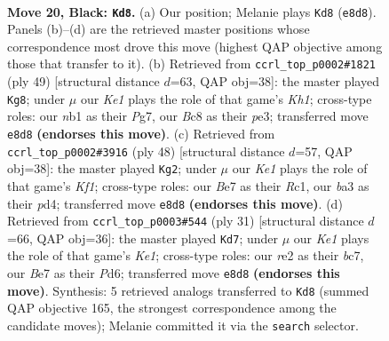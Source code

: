 \documentclass[11pt]{article}
\begin{document}
\clearpage

\begin{figure}[p]\centering
\begin{subfigure}{0.46\textwidth}\centering
\resizebox{\linewidth}{!}{%
\newchessgame
\chessboard[
  setfen={1rb1k2r/p1p1bp1p/2p3p1/2P5/PP3P1P/B7/4R3/RN2K3 b Q - 4 20},
  showmover=false,
  pgfstyle=straightmove, color=movearrow, markmove={e8-d8}
]}
\caption{}
\end{subfigure}\hfill
\begin{subfigure}{0.46\textwidth}\centering
\resizebox{\linewidth}{!}{%
\newchessgame
\chessboard[
  setfen={r4r1k/6p1/2p4p/pp1b4/6p1/P3P3/1P1R1PPK/1BR5 b - - 1 25},
  showmover=false,
  pgfstyle=straightmove, color=movearrow, markmove={h8-g8}
]}
\caption{}
\end{subfigure}
\\[4pt]
\begin{subfigure}{0.46\textwidth}\centering
\resizebox{\linewidth}{!}{%
\newchessgame
\chessboard[
  setfen={2rr4/1p3pk1/p2b2p1/8/1P1p2Pp/P2B3P/1P3P2/2RR1K2 w - - 1 25},
  showmover=false,
  pgfstyle=straightmove, color=movearrow, markmove={f1-g2}
]}
\caption{}
\end{subfigure}\hfill
\begin{subfigure}{0.46\textwidth}\centering
\resizebox{\linewidth}{!}{%
\newchessgame
\chessboard[
  setfen={r3k2r/2B2p2/2ppbnpp/8/P3P3/1N3P2/1PP2P1P/R3KB2 b Qkq - 0 16},
  showmover=false,
  pgfstyle=straightmove, color=movearrow, markmove={e8-d7}
]}
\caption{}
\end{subfigure}
\caption{\textbf{Move 20, Black: \texttt{Kd8}.} (a) Our position; Melanie plays \texttt{Kd8} (\texttt{e8d8}). Panels (b)--(d) are the retrieved master positions whose correspondence most drove this move (highest QAP objective among those that transfer to it). (b) Retrieved from \texttt{ccrl\_top\_p0002\#1821} (ply 49) [structural distance $d$=63, QAP obj=38]: the master played \texttt{Kg8}; under $\mu$ our \emph{Ke1} plays the role of that game's \emph{Kh1}; cross-type roles: our \emph{n}b1 as their \emph{P}g7, our \emph{B}c8 as their \emph{p}e3; transferred move \texttt{e8d8} \textbf{(endorses this move)}. (c) Retrieved from \texttt{ccrl\_top\_p0002\#3916} (ply 48) [structural distance $d$=57, QAP obj=38]: the master played \texttt{Kg2}; under $\mu$ our \emph{Ke1} plays the role of that game's \emph{Kf1}; cross-type roles: our \emph{B}e7 as their \emph{R}c1, our \emph{b}a3 as their \emph{p}d4; transferred move \texttt{e8d8} \textbf{(endorses this move)}. (d) Retrieved from \texttt{ccrl\_top\_p0003\#544} (ply 31) [structural distance $d$=66, QAP obj=36]: the master played \texttt{Kd7}; under $\mu$ our \emph{Ke1} plays the role of that game's \emph{Ke1}; cross-type roles: our \emph{r}e2 as their \emph{b}c7, our \emph{B}e7 as their \emph{P}d6; transferred move \texttt{e8d8} \textbf{(endorses this move)}. Synthesis: 5 retrieved analogs transferred to \texttt{Kd8} (summed QAP objective 165, the strongest correspondence among the candidate moves); Melanie committed it via the \texttt{search} selector.}
\label{fig:thought-m39}
\end{figure}
\end{document}
